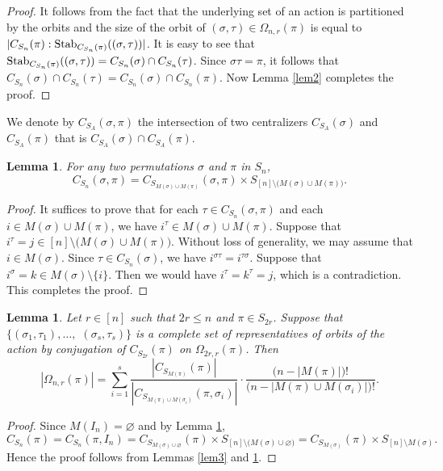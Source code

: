 \documentclass{amsart}
\newtheorem{lem}[thm]{Lemma}
\numberwithin{equation}{section}
\begin{document}
\begin{proof}
	It follows from the fact that the underlying set of an action  is partitioned by the orbits and the size of the orbit of $(\sigma,\tau)\in \Omega_{n,r}(\pi)$ is equal to $|C_{S_n}(\pi):{\rm Stab}_{C_{S_n}(\pi)}((\sigma,\tau))|$. It is easy to see that ${\rm Stab}_{C_{S_n}(\pi)}((\sigma,\tau))=C_{S_n}(\sigma) \cap C_{S_n}(\tau)$. Since $\sigma \tau=\pi$, it follows that $C_{S_n}(\sigma) \cap C_{S_n}(\tau)=C_{S_n}(\sigma) \cap C_{S_n}(\pi)$. Now Lemma \ref{lem2} completes the proof. 
\end{proof}
We denote by $C_{S_A}(\sigma,\pi)$ the intersection of two centralizers $C_{S_A}(\sigma)$ and $C_{S_A}(\pi)$ that is $C_{S_A}(\sigma) \cap C_{S_A}(\pi)$.
\begin{lem}\label{lem4}
	For any two permutations $\sigma$ and $\pi$ in $S_n$, $$C_{S_n}(\sigma, \pi)=C_{S_{M(\sigma)\cup M(\pi)}}(\sigma,\pi) \times 
		S_{[n] \setminus \big( M(\sigma) \cup M(\pi) \big)}.$$
\end{lem}
\begin{proof}
It suffices to prove that for each $\tau \in C_{S_n}(\sigma, \pi)$ and each $i \in M(\sigma) \cup M(\pi)$, we have $i^\tau \in M(\sigma) \cup M(\pi)$. 
Suppose  that $i^\tau = j \in [n] \setminus \big( M(\sigma) \cup M(\pi) \big)$. Without loss of generality, we may assume that  $i\in M(\sigma)$.
Since $\tau \in C_{S_n}(\sigma)$, we have $i^{\sigma\tau} = i^{\tau\sigma}$. 
Suppose that $i^\sigma = k \in M(\sigma) \setminus \{i\}$. 
Then we would have $i^{\tau} = k^\tau = j$, which is a contradiction. 
This completes the proof.
\end{proof}
\begin{lem}\label{lem5}
Let $r\in [n]$ such that $2r\leq n$ and $\pi \in S_{2r}$. Suppose that  $\{(\sigma_1,\tau_1),\dots,$ $(\sigma_s,\tau_s)\}$ is a complete set of  representatives of orbits of the action by conjugation of $C_{S_{2r}}(\pi)$ on $\Omega_{2r,r}(\pi)$. Then 
\begin{equation}\label{rel1}
|\Omega_{n,r}(\pi)|=\sum_{i=1}^s \frac{|C_{S_{M(\pi)}}(\pi)|}{|C_{S_{M(\pi)\cup M(\sigma_i)}}(\pi,\sigma_i)|}\cdot \frac{\big(n-|M(\pi)|\big)!}{\big(n-|M(\pi)\cup M(\sigma_i)|\big)!}.
\end{equation}
\end{lem}
\begin{proof}
Since $M(I_n)=\varnothing$ and 	 by Lemma \ref{lem4}, $$C_{S_n}(\pi)=C_{S_n}(\pi, I_n)=C_{S_{M(\sigma) \cup \varnothing}}(\pi) \times S_{[n]\setminus \big(M(\sigma) \cup \varnothing \big)}=C_{S_{M(\sigma)}}(\pi) \times S_{[n]\setminus M(\sigma)}.$$ 
	Hence the proof follows from Lemmas \ref{lem3} and \ref{lem4}. 
\end{proof}
\end{document}
